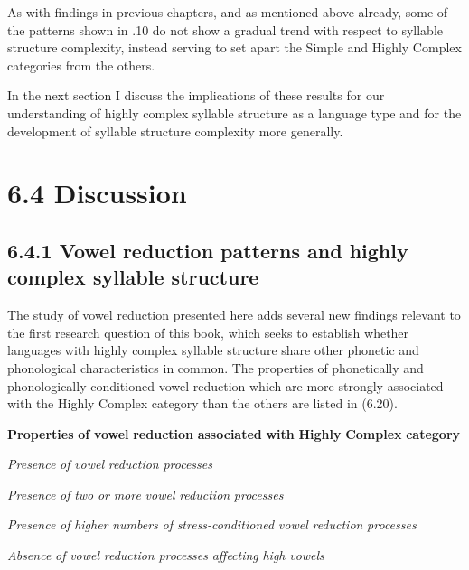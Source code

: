  As with findings in previous chapters, and as mentioned above already, some of the patterns shown in .10 do not show a gradual trend with respect to syllable structure complexity, instead serving to set apart the Simple and Highly Complex categories from the others.



  In the next section I discuss the implications of these results for our understanding of highly complex syllable structure as a language type and for the development of syllable structure complexity more generally.


\section{6.4 Discussion}
\subsection{6.4.1 Vowel reduction patterns and highly complex syllable structure}

  The study of vowel reduction presented here adds several new findings relevant to the first research question of this book, which seeks to establish whether languages with highly complex syllable structure share other phonetic and phonological characteristics in common. The properties of phonetically and phonologically conditioned vowel reduction which are more strongly associated with the Highly Complex category than the others are listed in (6.20).



\ea\label{ex:(6.20)}
  \textbf{Properties} \textbf{of} \textbf{vowel} \textbf{reduction} \textbf{associated} \textbf{with} \textbf{Highly} \textbf{Complex} \textbf{category}



\textit{Presence} \textit{of} \textit{vowel} \textit{reduction} \textit{processes}



\textit{Presence} \textit{of} \textit{two} \textit{or} \textit{more} \textit{vowel} \textit{reduction} \textit{processes}



\textit{Presence} \textit{of} \textit{higher} \textit{numbers} \textit{of} \textit{stress-conditioned} \textit{vowel} \textit{reduction} \textit{processes}



\textit{Absence} \textit{of} \textit{vowel} \textit{reduction} \textit{processes} \textit{affecting} \textit{high} \textit{vowels}



